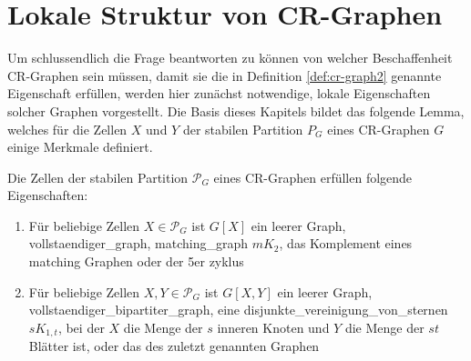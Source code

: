 \section{Lokale Struktur von CR-Graphen}
\label{sec/struktur_lokal}


Um schlussendlich die Frage beantworten zu können von welcher Beschaffenheit CR-Graphen sein müssen, damit sie die in Definition \ref{def:cr-graph2} genannte Eigenschaft erfüllen, werden hier zunächst notwendige, lokale Eigenschaften solcher Graphen vorgestellt.
Die Basis dieses Kapitels bildet das folgende Lemma, welches für die Zellen $X$ und $Y$ der stabilen Partition $P_G$ eines CR-Graphen $G$ einige Merkmale definiert.

\begin{Lemma}
	Die Zellen der stabilen Partition $\mathcal{P}_G$ eines CR-Graphen erfüllen folgende Eigenschaften:
	
	\begin{enumerate}[label=(\Alph*)]
		\item Für beliebige Zellen $X\in \mathcal{P}_G$ ist $G[X]$ ein leerer Graph, \gls{vollstaendiger_graph}, \gls{matching_graph} $mK_2$, das Komplement eines matching Graphen oder der 5er \gls{zyklus}
		\item Für beliebige Zellen $X,Y\in \mathcal{P}_G$ ist $G[X,Y]$ ein leerer Graph, \gls{vollstaendiger_bipartiter_graph}, eine \gls{disjunkte_vereinigung_von_sternen} $sK_{1,t}$, bei der $X$ die Menge der $s$ inneren Knoten und $Y$ die Menge der $st$ Blätter ist, oder das  des zuletzt genannten Graphen
	\end{enumerate}
\end{Lemma}
